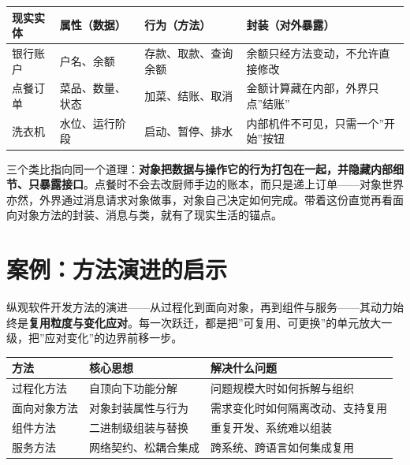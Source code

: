 \documentclass[
]{ctexbook}
\newcounter{none}
\begin{document}
{\def\LTcaptype{none} %
\begin{longtable}[]{@{}
  >{\raggedright\arraybackslash}p{}
  >{\raggedright\arraybackslash}p{}
  >{\raggedright\arraybackslash}p{}
  >{\raggedright\arraybackslash}p{}@{}}
\toprule\noalign{}
\begin{minipage}[b]{\linewidth}\raggedright
现实实体
\end{minipage} & \begin{minipage}[b]{\linewidth}\raggedright
属性（数据）
\end{minipage} & \begin{minipage}[b]{\linewidth}\raggedright
行为（方法）
\end{minipage} & \begin{minipage}[b]{\linewidth}\raggedright
封装（对外暴露）
\end{minipage} \\
\midrule\noalign{}
\endhead
\bottomrule\noalign{}
\endlastfoot
银行账户 & 户名、余额 & 存款、取款、查询余额 &
余额只经方法变动，不允许直接修改 \\
点餐订单 & 菜品、数量、状态 & 加菜、结账、取消 &
金额计算藏在内部，外界只点''结账'' \\
洗衣机 & 水位、运行阶段 & 启动、暂停、排水 &
内部机件不可见，只需一个''开始''按钮 \\
\end{longtable}
}

三个类比指向同一个道理：\textbf{对象把数据与操作它的行为打包在一起，并隐藏内部细节、只暴露接口}。点餐时不会去改厨师手边的账本，而只是递上订单------对象世界亦然，外界通过消息请求对象做事，对象自己决定如何完成。带着这份直觉再看面向对象方法的封装、消息与类，就有了现实生活的锚点。

\section{案例：方法演进的启示}\label{ux6848ux4f8bux65b9ux6cd5ux6f14ux8fdbux7684ux542fux793a}

纵观软件开发方法的演进------从过程化到面向对象，再到组件与服务------其动力始终是\textbf{复用粒度与变化应对}。每一次跃迁，都是把''可复用、可更换''的单元放大一级，把''应对变化''的边界前移一步。

{\def\LTcaptype{none} %
\begin{longtable}[]{@{}lll@{}}
\toprule\noalign{}
方法 & 核心思想 & 解决什么问题 \\
\midrule\noalign{}
\endhead
\bottomrule\noalign{}
\endlastfoot
过程化方法 & 自顶向下功能分解 & 问题规模大时如何拆解与组织 \\
面向对象方法 & 对象封装属性与行为 & 需求变化时如何隔离改动、支持复用 \\
组件方法 & 二进制级组装与替换 & 重复开发、系统难以组装 \\
服务方法 & 网络契约、松耦合集成 & 跨系统、跨语言如何集成复用 \\
\end{longtable}
}
\end{document}
